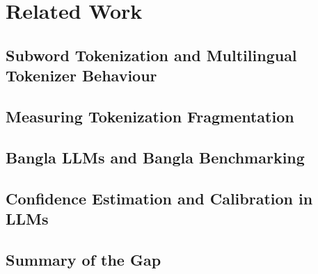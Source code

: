 \section{Related Work}
\subsection{Subword Tokenization and Multilingual Tokenizer Behaviour}

\subsection{Measuring Tokenization Fragmentation}

\subsection{Bangla LLMs and Bangla Benchmarking}

\subsection{Confidence Estimation and Calibration in LLMs}

\subsection{Summary of the Gap}
